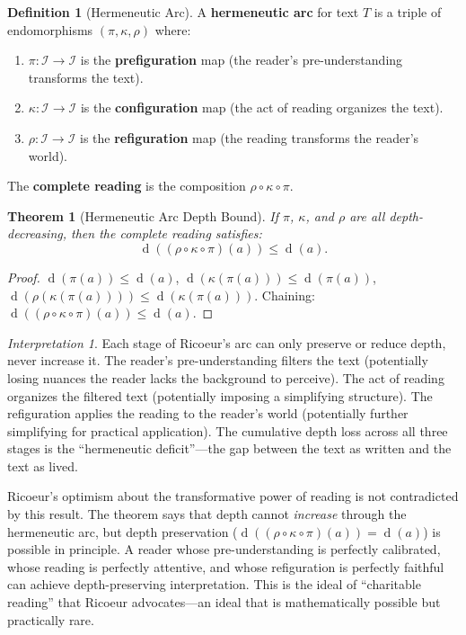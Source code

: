 \documentclass[11pt,openany]{book}
\theoremstyle{definition}
\newtheorem{definition}[axiom]{Definition}
\theoremstyle{plain}
\newtheorem{theorem}[axiom]{Theorem}
\theoremstyle{remark}
\newtheorem{interpretation}[axiom]{Interpretation}
\newcommand{\IS}{\mathcal{I}}               %
\newcommand{\depth}{\operatorname{d}}       %
\begin{document}
\begin{definition}[Hermeneutic Arc]
A \textbf{hermeneutic arc} for text $T$ is a triple of endomorphisms $(\pi, \kappa, \rho)$ where:
\begin{enumerate}
\item $\pi : \IS \to \IS$ is the \textbf{prefiguration} map (the reader's pre-understanding transforms the text).
\item $\kappa : \IS \to \IS$ is the \textbf{configuration} map (the act of reading organizes the text).
\item $\rho : \IS \to \IS$ is the \textbf{refiguration} map (the reading transforms the reader's world).
\end{enumerate}
The \textbf{complete reading} is the composition $\rho \circ \kappa \circ \pi$.
\end{definition}

\begin{theorem}[Hermeneutic Arc Depth Bound]
If $\pi$, $\kappa$, and $\rho$ are all depth-decreasing, then the complete reading satisfies:
\[
\depth((\rho \circ \kappa \circ \pi)(a)) \leq \depth(a).
\]
\end{theorem}

\begin{proof}
$\depth(\pi(a)) \leq \depth(a)$, $\depth(\kappa(\pi(a))) \leq \depth(\pi(a))$, $\depth(\rho(\kappa(\pi(a)))) \leq \depth(\kappa(\pi(a)))$. Chaining: $\depth((\rho \circ \kappa \circ \pi)(a)) \leq \depth(a)$.
\end{proof}

\begin{interpretation}
Each stage of Ricoeur's arc can only preserve or reduce depth, never increase it. The reader's pre-understanding filters the text (potentially losing nuances the reader lacks the background to perceive). The act of reading organizes the filtered text (potentially imposing a simplifying structure). The refiguration applies the reading to the reader's world (potentially further simplifying for practical application). The cumulative depth loss across all three stages is the ``hermeneutic deficit''---the gap between the text as written and the text as lived.

Ricoeur's optimism about the transformative power of reading is not contradicted by this result. The theorem says that depth cannot \emph{increase} through the hermeneutic arc, but depth preservation ($\depth((\rho \circ \kappa \circ \pi)(a)) = \depth(a)$) is possible in principle. A reader whose pre-understanding is perfectly calibrated, whose reading is perfectly attentive, and whose refiguration is perfectly faithful can achieve depth-preserving interpretation. This is the ideal of ``charitable reading'' that Ricoeur advocates---an ideal that is mathematically possible but practically rare.
\end{interpretation}
\end{document}
